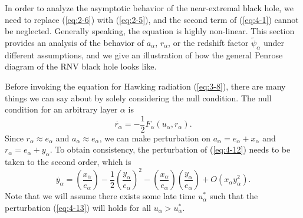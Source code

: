 \documentclass[letterpaper,12pt]{article}
\begin{document}
In order to analyze the asymptotic behavior of the near-extremal black hole, we need to replace (\ref{eq:2-6}) with (\ref{eq:2-5}), and the second term of (\ref{eq:4-1}) cannot be neglected. Generally speaking, the equation is highly non-linear. 
This section provides an analysis of the behavior of $a_{\alpha}$, $r_{\alpha}$, or the redshift factor $\tilde{\psi}_{\alpha}$ under different assumptions, and we give an illustration of how the general Penrose diagram of the RNV black hole looks like.


Before invoking the equation for Hawking radiation (\ref{eq:3-8}), there are many things we can say about by solely considering the null condition. The null condition for an arbitrary layer $\alpha$ is
\begin{equation}\label{eq:4-12}
\dot{r_{\alpha}} = -\frac{1}{2}F_{\alpha}(u_{\alpha},r_{\alpha}).
\end{equation}
 Since $r_{\alpha} \approx e_{\alpha}$ and $a_{\alpha} \approx e_{\alpha}$, we can make perturbation on $a_{\alpha} = e_{\alpha}+x_{\alpha}$ and $r_{\alpha} = e_{\alpha}+y_{\alpha}$. To obtain consistency, the perturbation of (\ref{eq:4-12}) needs to be taken to the second order, which is
\begin{equation}\label{eq:4-13}
\dot{y_{\alpha}} = \left(\frac{x_{\alpha}}{e_{\alpha}}\right)-\frac{1}{2}\left(\frac{y_{\alpha}}{e_{\alpha}}\right)^{2}- \left(\frac{x_{\alpha}}{e_{\alpha}}\right) \left(\frac{y_{\alpha}}{e_{\alpha}}\right) + O(x_{\alpha}y^{2}_{\alpha}).
\end{equation}
Note that we will assume there exists some late time $u_{\alpha}^{*}$ such that the perturbation (\ref{eq:4-13}) will holds for all $u_{\alpha} > u_{\alpha}^{*}$. 
\end{document}
